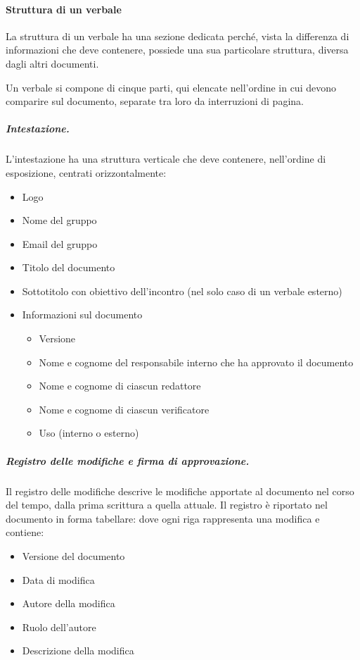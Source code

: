 \paragraph{Struttura di un verbale}
La struttura di un verbale ha una sezione dedicata perché, vista la differenza di informazioni che deve contenere, possiede una sua particolare struttura, diversa dagli altri documenti.
\par Un verbale si compone di cinque parti, qui elencate nell'ordine in cui devono comparire sul documento, separate tra loro da interruzioni di pagina.
\subparagraph{Intestazione.}
L'intestazione ha una struttura verticale che deve contenere, nell'ordine di esposizione, centrati orizzontalmente:
\begin{itemize}
    \item Logo
    \item Nome del gruppo
    \item Email del gruppo
    \item Titolo del documento
    \item Sottotitolo con obiettivo dell'incontro (nel solo caso di un verbale esterno)
    \item Informazioni sul documento
    \begin{itemize}
        \item Versione
        \item Nome e cognome del responsabile interno che ha approvato il documento
        \item Nome e cognome di ciascun redattore
        \item Nome e cognome di ciascun verificatore
        \item Uso (interno o esterno)
    \end{itemize}
\end{itemize}
\subparagraph{Registro delle modifiche e firma di approvazione.}
Il registro delle modifiche descrive le modifiche apportate al documento nel corso del tempo, dalla prima scrittura a quella attuale. Il registro è riportato nel documento in forma tabellare: dove ogni riga rappresenta una modifica e contiene:
\begin{itemize}
    \item Versione del documento
    \item Data di modifica
    \item Autore della modifica
    \item Ruolo dell'autore
    \item Descrizione della modifica
\end{itemize}

